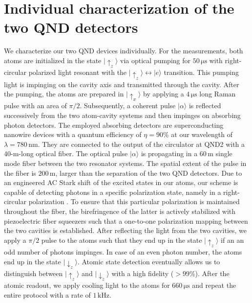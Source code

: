 \documentclass[prl,twocolumn,amsmath,amssymb,bibnotes,aps,longbibliography]{revtex4-1}
\newcommand{\ket}[1]{|{#1}\rangle}
\begin{document}
\section{Individual characterization of the two QND detectors}
\noindent We characterize our two QND devices individually. For the measurements, both atoms are initialized in the state $\ket{\uparrow_z}$ via optical pumping for $50\,\mathrm{\mu s}$ with right-circular polarized light resonant with the $\ket{\uparrow_z}\leftrightarrow \ket{e}$ transition. This pumping light is impinging on the cavity axis and transmitted through the cavity. After the pumping, the atoms are prepared in $\ket{\uparrow_x}$ by applying a $4\,\mathrm{\mu s}$ long Raman pulse with an area of $\pi/2$. Subsequently, a coherent pulse $\ket{\alpha}$ is reflected successively from the two atom-cavity systems and then impinges on absorbing photon detectors. The employed absorbing detectors are superconducting nanowire devices with a quantum efficiency of $\eta=90\%$ at our wavelength of $\lambda=780\,\mathrm{nm}$. They are connected to the output of the circulator at QND2 with a 40-m-long optical fiber. The optical pulse $\ket{\alpha}$ is propagating in a $60\,\mathrm{m}$ single mode fiber between the two resonator systems. The spatial extent of the pulse in the fiber is $200\,\mathrm{m}$, larger than the separation of the two QND detectors. Due to an engineered AC Stark shift of the excited states in our atoms, our scheme is capable of detecting photons in a specific polarization state, namely in a right-circular polarization \cite{hacker2019supplement}. To ensure that this particular polarization is maintained throughout the fiber, the birefringence of the latter is actively stabilized with piezoelectric fiber squeezers \cite{rosenfeld2008supplement} such that a one-to-one polarization mapping between the two cavities is established. After reflecting the light from the two cavities, we apply a $\pi/2$ pulse to the atoms such that they end up in the state $\ket{\uparrow_z}$ if an an odd number of photons impinges. In case of an even photon number, the atoms end up in the state $\ket{\downarrow_z}$. Atomic state detection eventually allows us to distinguish between $\ket{\uparrow_z}$ and $\ket{\downarrow_z}$ with a high fidelity ($>99\%$). After the atomic readout, we apply cooling light to the atoms for $660\,\mathrm{\mu s}$ and repeat the entire protocol with a rate of $1\,\mathrm{kHz}$.
\end{document}
